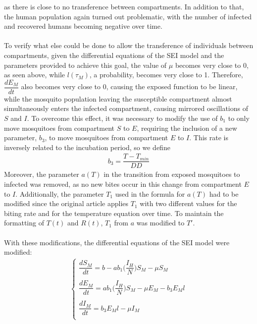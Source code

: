 as there is close to no transference between compartments. In addition to that, 
the human population again turned out problematic, with the number of infected and 
recovered humans becoming negative over time.  
\\\\
To verify what else could be done to allow the 
transference of individuals between compartments,
given the differential equations of the SEI model and the 
parameters provided to achieve this goal, the value of $\mu$ becomes 
very close to 0, as seen above, while $l(\tau_M)$, a probability, becomes very 
close to 1. Therefore, $\dfrac{dE_M}{dt}$ also becomes very close to 0, 
causing the exposed function to be linear, while the mosquito population 
leaving the susceptible compartment almost simultaneously enters 
the infected compartment, causing mirrored oscillations of $S$ and $I$. 
To overcome this effect, it was necessary to modify the use of $b_1$ to 
only move mosquitoes from compartment $S$ to $E$, requiring the inclusion 
of a new parameter, $b_3$, to move mosquitoes from compartment $E$ to $I$. 
This rate is inversely related to the incubation period, so we define
\begin{gather*}
b_3 = \dfrac{T-T_{min}}{DD}
\end{gather*}
Moreover, the parameter $a(T)$ in the transition from 
exposed mosquitoes to infected was removed, as no new bites occur 
in this change from compartment $E$ to $I$. Additionally, 
the parameter $T_1$ used in the formula for $a(T)$ had to 
be modified since the original article applies $T_1$ with 
two different values for the biting rate and for the temperature 
equation over time. To maintain the formatting of $T(t)$ and 
$R(t)$, $T_1$ from $a$ was modified to $T'$.
\\\\
With these modifications, the differential equations of the SEI model were modified:
\begin{gather*}
\begin{cases}
\dfrac{dS_M}{dt} = b - ab_1\bigg(\dfrac{I_H}{N}\bigg)S_M - \mu S_M\\
\\
\dfrac{dE_M}{dt} = ab_1\bigg(\dfrac{I_H}{N}\bigg)S_M - \mu E_M - b_3E_Ml\\
\\
\dfrac{dI_M}{dt} = b_3E_Ml -\mu I_M\\
\end{cases}
\end{gather*}
\\\\
